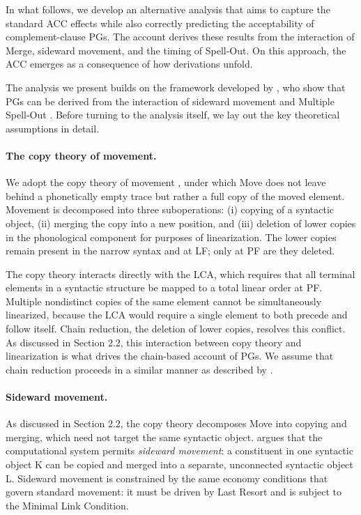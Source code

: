 \documentclass[12pt]{article}
\begin{document}
In what follows, we develop an alternative analysis that aims to capture the standard ACC effects while also correctly predicting the acceptability of complement-clause PGs. The account derives these results from the interaction of Merge, sideward movement, and the timing of Spell-Out. On this approach, the ACC emerges as a consequence of how derivations unfold.

The analysis we present builds on the framework developed by \cite{nunes2000}, who show that PGs can be derived from the interaction of sideward movement \citep{nunes2004} and Multiple Spell-Out \citep{uriagereka1999}. Before turning to the analysis itself, we lay out the key theoretical assumptions in detail.

\paragraph{The copy theory of movement.} We adopt the copy theory of movement \citep{chomsky1995}, under which Move does not leave behind a phonetically empty trace but rather a full copy of the moved element. Movement is decomposed into three suboperations: (i) copying of a syntactic object, (ii) merging the copy into a new position, and (iii) deletion of lower copies in the phonological component for purposes of linearization. The lower copies remain present in the narrow syntax and at LF; only at PF are they deleted.

The copy theory interacts directly with the LCA, which requires that all terminal elements in a syntactic structure be mapped to a total linear order at PF. Multiple nondistinct copies of the same element cannot be simultaneously linearized, because the LCA would require a single element to both precede and follow itself. Chain reduction, the deletion of lower copies, resolves this conflict. As discussed in Section 2.2, this interaction between copy theory and linearization is what drives the chain-based account of PGs. We assume that chain reduction proceeds in a similar manner as described by \cite{nunes2004}.

\paragraph{Sideward movement.} As discussed in Section 2.2, the copy theory decomposes Move into copying and merging, which need not target the same syntactic object. \cite{nunes2004} argues that the computational system permits \textit{sideward movement}: a constituent in one syntactic object K can be copied and merged into a separate, unconnected syntactic object L. Sideward movement is constrained by the same economy conditions that govern standard movement: it must be driven by Last Resort and is subject to the Minimal Link Condition.
\end{document}
